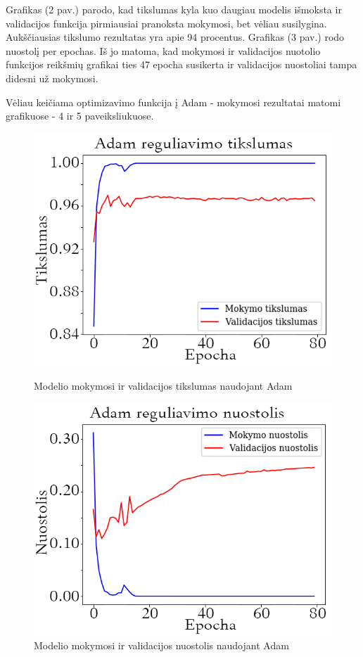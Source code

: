 \documentclass{VUMIFPSkursinis}
\begin{document}
Grafikas (2 pav.) parodo, kad tikslumas kyla kuo daugiau modelis išmoksta ir validacijos funkcija pirmiausiai pranoksta mokymosi, bet vėliau susilygina. Aukščiausias tikslumo rezultatas yra apie 94 procentus.
Grafikas (3 pav.) rodo nuostolį per epochas. Iš jo matoma, kad mokymosi ir validacijos nuotolio funkcijos reikšmių grafikai ties 47 epocha susikerta ir validacijos nuostoliai tampa didesni už mokymosi.

Vėliau keičiama optimizavimo funkcija į Adam - mokymosi rezultatai matomi grafikuose - 4 ir 5 paveiksliukuose.

\begin{figure}[!htbp]
  \centering
  \begin{minipage}[b]{0.49\textwidth}
    \includegraphics[width=\textwidth]{img/FT/Adam_acc1.png}
    \caption{Modelio mokymosi ir validacijos tikslumas naudojant Adam}
  \end{minipage}
  \begin{minipage}[b]{0.49\textwidth}
    \includegraphics[width=\textwidth]{img/FT/Adam_loss1.png}
    \caption{Modelio mokymosi ir validacijos nuostolis naudojant Adam}
  \end{minipage}
\end{figure}
\end{document}
